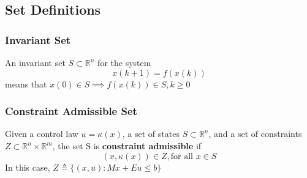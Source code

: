 \documentclass{article}
\begin{document}
\subsection{Set Definitions}
\subsubsection{Invariant Set}
An invariant set $S \subset \mathbb{R}^n$ for the system 
\[
x(k+1) = f(x(k))
\]
means that $x(0) \in S \implies f(x(k)) \in S, k \geq 0$
\subsubsection{Constraint Admissible Set}
Given a control law $u = \kappa(x)$, a set of states $S \subset \mathbb R^n$, and a set of constraints $Z \subset \mathbb R^n \times \mathbb R^m$, the set S is \textbf{constraint admissible} if
\[
(x,\kappa(x)) \in Z, \text{for all } x \in S
\]
In this case, $Z \triangleq \{(x,u) : Mx + Eu \leq b \}$
\end{document}
